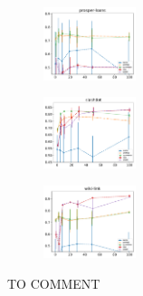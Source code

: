 \begin{subfigure}
         \centering
      \includegraphics[width=0.24\textwidth]{fig/prosper-loans__entropy@_roc_evo}
\end{subfigure}                                                             
\begin{subfigure}                                                           
         \centering                                                         
      \includegraphics[width=0.24\textwidth]{fig/slashdot__entropy@_roc_evo}
\end{subfigure}                                                             
\begin{subfigure}                                                           
         \centering                                                         
      \includegraphics[width=0.24\textwidth]{fig/wiki-link__entropy@_roc_evo}
\end{subfigure}                                                             
\caption{TO COMMENT}                                                                     

